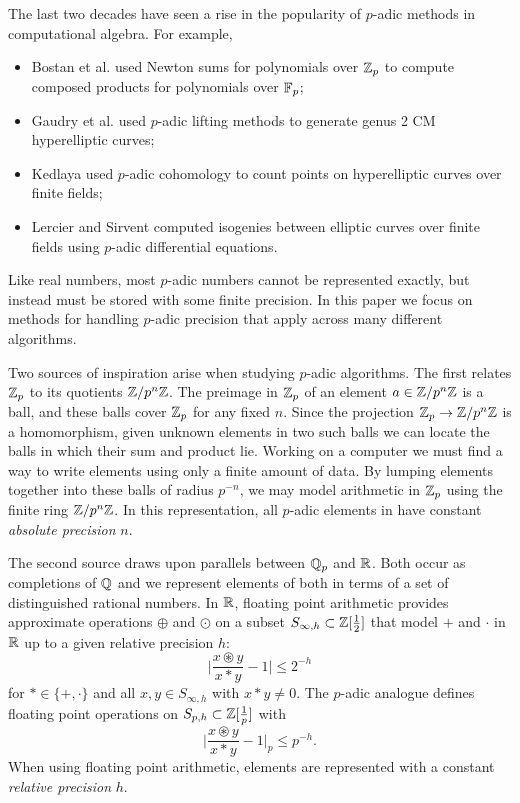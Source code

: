 \documentclass{lms}
\begin{document}
The last two decades have seen a rise in the popularity of $p$-adic methods in
computational algebra.  For example,
\begin{itemize}
\item Bostan et al. \cite{boston-gonzalez-perdry-schost:05a} used Newton sums for polynomials over $\mathbb Z_p$ to compute composed products for polynomials over $\mathbb{F}_p$;
\item Gaudry et al. \cite{gaudry-houtmann-weng-ritzenthaler-kohel:06a} used $p$-adic lifting methods to generate genus 2 CM hyperelliptic curves;
\item Kedlaya \cite{kedlaya:01a} used $p$-adic cohomology to count points on hyperelliptic curves over finite fields;
\item Lercier and Sirvent \cite{lercier-sirvent:08a} computed isogenies between elliptic curves over finite fields using $p$-adic differential equations.
\end{itemize}
Like real numbers, most $p$-adic numbers cannot be represented exactly, but instead must be
stored with some finite precision.  In this paper we focus on methods for handling $p$-adic precision
that apply across many different algorithms.

Two sources of inspiration arise when studying $p$-adic algorithms.
The first relates $\mathbb Z_p$ to its quotients $\mathbb Z/p^n\mathbb Z$.  The preimage in
$\mathbb Z_p$ of an element $a \in \mathbb Z / p^n \mathbb Z$ is a ball, and these balls cover
$\mathbb Z_p$ for any fixed $n$.  Since the projection $\mathbb Z_p \to \mathbb Z/p^n\mathbb Z$ is a
homomorphism, given unknown elements in two such balls we can
locate the balls in which their sum and product lie.  Working on a computer
we must find a way to write elements using only a finite amount of data.
By lumping elements together into these balls of radius $p^{-n}$, we may
model arithmetic in $\mathbb Z_p$ using the finite ring $\mathbb Z / p^n \mathbb Z$.  In this representation,
all $p$-adic elements in have constant \emph{absolute precision} $n$.

The second source draws upon parallels between $\mathbb Q_p$ and $\mathbb R$.  Both
occur as completions of $\mathbb Q$ and we represent elements of both in terms
of a set of distinguished rational numbers.
In $\mathbb R$, floating point arithmetic provides approximate operations $\oplus$ and $\odot$ on a
subset $S_{\infty,h} \subset \mathbb Z[\frac12]$ that model $+$ and $\cdot$ in $\mathbb R$ up to a given relative precision $h$:
\[
\Big\vert \frac{x \circledast y}{x \ast y} - 1 \Big\vert \le 2^{-h}
\]
for $\ast \in \{+, \cdot\}$ and all $x, y \in S_{\infty,h}$ with $x \ast y \ne 0$.  The $p$-adic analogue
defines floating point operations on $S_{p,h} \subset \mathbb Z[\frac1p]$ with
\[
\Big\vert \frac{x \circledast y}{x \ast y} - 1 \Big\vert_p \le p^{-h}.
\]
When using floating point arithmetic, elements are represented with a constant \emph{relative precision} $h$.
\end{document}
